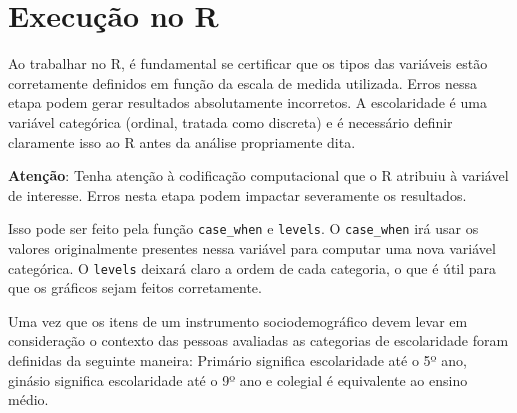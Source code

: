 \documentclass[
]{book}
\newenvironment{Shaded}{\begin{snugshade}}{\end{snugshade}}
\newcommand{\DataTypeTok}[1]{\textcolor[rgb]{0.13,0.29,0.53}{#1}}
\newcommand{\DecValTok}[1]{\textcolor[rgb]{0.00,0.00,0.81}{#1}}
\newcommand{\KeywordTok}[1]{\textcolor[rgb]{0.13,0.29,0.53}{\textbf{#1}}}
\newcommand{\NormalTok}[1]{#1}
\newcommand{\OperatorTok}[1]{\textcolor[rgb]{0.81,0.36,0.00}{\textbf{#1}}}
\newcommand{\StringTok}[1]{\textcolor[rgb]{0.31,0.60,0.02}{#1}}
\begin{document}
\hypertarget{execuuxe7uxe3o-no-r-5}{%
\section{Execução no R}\label{execuuxe7uxe3o-no-r-5}}

Ao trabalhar no R, é fundamental se certificar que os tipos das variáveis estão corretamente definidos em função da escala de medida utilizada. Erros nessa etapa podem gerar resultados absolutamente incorretos. A escolaridade é uma variável categórica (ordinal, tratada como discreta) e é necessário definir claramente isso ao R antes da análise propriamente dita.

\begin{warning}

\textbf{Atenção}: Tenha atenção à codificação computacional que o R atribuiu à variável de interesse. Erros nesta etapa podem impactar severamente os resultados.

\end{warning}

Isso pode ser feito pela função \texttt{case\_when} e \texttt{levels}. O \texttt{case\_when} irá usar os valores originalmente presentes nessa variável para computar uma nova variável categórica. O \texttt{levels} deixará claro a ordem de cada categoria, o que é útil para que os gráficos sejam feitos corretamente.

Uma vez que os itens de um instrumento sociodemográfico devem levar em consideração o contexto das pessoas avaliadas as categorias de escolaridade foram definidas da seguinte maneira: Primário significa escolaridade até o 5º ano, ginásio significa escolaridade até o 9º ano e colegial é equivalente ao ensino médio.

\begin{Shaded}
\end{Shaded}
\end{document}
